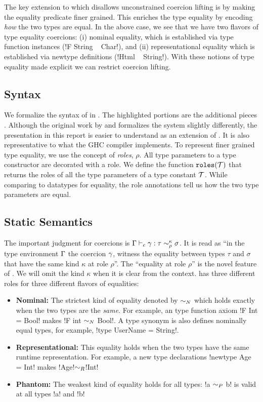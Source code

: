 \documentclass[screen,nonacm,manuscript,review]{acmart} %
\begin{document}
The key extension to \SFC which disallows unconstrained coercion lifting
is by making the equality predicate finer grained.
This enriches the type equality by encoding
\emph{how} the two types are equal. In the above case, we see that
we have two flavors of type equality coercions:
(i) nominal equality, which is established
via type function instances (!F String ~ Char!), and
(ii) representational equality which is established
via newtype definitions (!Html ~ String!).
With these notions of type equality made explicit we
can restrict coercion lifting.

\subsection{Syntax}\label{sec:sfr-syntax}
We formalize the syntax of \SFR in .
The highlighted portions are the additional pieces
. Although the original work
by \citet{breitner_safe_2014} and \citet{weirich_generative_2011}
formalizes the system slightly differently, the presentation in
this report is easier to understand as an extension of \SFC.
It is also representative to what the GHC compiler implements.
To represent finer grained type equality, we use the concept
of \emph{roles}, $\rho$. All type parameters to a type constructor are
decorated with a role. We define the function
$\texttt{roles}(\mathcal{T})$ that returns the roles of
all the type parameters of a type constant $\mathcal{T}$.
While comparing to datatypes for equality, the role annotations
tell us how the two type parameters are equal.

\subsection{Static Semantics}\label{sec:sfr-static-sem}
The important judgment for coercions is
$\Gamma \vdash_{c} \gamma : \tau\sim^\kappa_\rho\sigma$.
It is read as ``in the type environment $\Gamma$
the coercion $\gamma$, witness the equality between types $\tau$
and $\sigma$ that have the same kind $\kappa$ at role $\rho$''.
The ``equality at role $\rho$'' is the novel feature of \SFR.
We will omit the kind $\kappa$ when it is clear from the context.
\SFR has three different roles for three different flavors of equalities:
\begin{itemize}
\item\textbf{Nominal:} The strictest kind of equality denoted by
  $\mathrel{\sim_N}$ which holds exactly when the two types are the \emph{same}.
  For example, an type function axiom !F Int = Bool!
  makes !F int $\mathrel{\sim_N}$ Bool!. A type synonym is also defines nominally
  equal types, for example, !type UserName = String!.
\item\textbf{Representational:} This equality holds when the two types
  have the same runtime representation.
  For example, a new type declarations !newtype Age = Int! makes
  !Age!$\mathrel{\sim_R}$!Int!
\item\textbf{Phantom:} The weakest kind of equality holds for all
  types: !a $\mathrel{\sim_P}$ b! is valid at all types !a! and !b!
\end{itemize}
\end{document}
